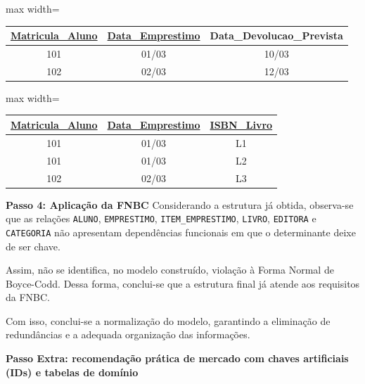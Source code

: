 \begin{adjustbox}{max width=\textwidth}
\begin{tabular}{|c|c|c|}
\hline
\textbf{\underline{Matricula\_Aluno}} & \textbf{\underline{Data\_Emprestimo}} & Data\_Devolucao\_Prevista \\ \hline
101 & 01/03 & 10/03 \\ \hline
102 & 02/03 & 12/03 \\ \hline
\end{tabular}
\end{adjustbox}

\vspace{0.3cm}

\vspace{0.5cm}

\begin{adjustbox}{max width=\textwidth}
\begin{tabular}{|c|c|c|}
\hline
\textbf{\underline{Matricula\_Aluno}} & \textbf{\underline{Data\_Emprestimo}} & \textbf{\underline{ISBN\_Livro}} \\ \hline
101 & 01/03 & L1 \\ \hline
101 & 01/03 & L2 \\ \hline
102 & 02/03 & L3 \\ \hline
\end{tabular}
\end{adjustbox}

\vspace{0.3cm}

\vspace{0.4cm}

\justify

\textbf{Passo 4: Aplicação da FNBC}
Considerando a estrutura já obtida, observa-se que as relações \texttt{ALUNO}, \texttt{EMPRESTIMO}, \texttt{ITEM\_EMPRESTIMO}, \texttt{LIVRO}, \texttt{EDITORA} e \texttt{CATEGORIA} não apresentam dependências funcionais em que o determinante deixe de ser chave.

Assim, não se identifica, no modelo construído, violação à Forma Normal de Boyce-Codd. Dessa forma, conclui-se que a estrutura final já atende aos requisitos da FNBC.

Com isso, conclui-se a normalização do modelo, garantindo a eliminação de redundâncias e a adequada organização das informações.

\vspace{0.4cm}

\textbf{Passo Extra: recomendação prática de mercado com chaves artificiais (IDs) e tabelas de domínio}

